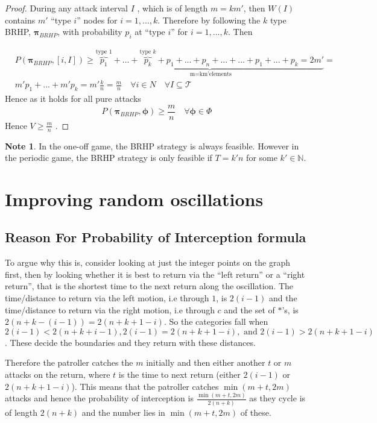 \documentclass[a4paper,10pt]{article}
\theoremstyle{definition}
\theoremstyle{definition}
\theoremstyle{remark}
\theoremstyle{definition}
\newtheorem*{note}{Note}
\begin{document}
\begin{proof}
During any attack interval $I$ , which is of length $m=km'$, then $W(I)$ contains $m'$ ``type $i$'' nodes for $i=1,...,k$. Therefore by following the $k$ type BRHP, $\bm{\pi}_{BRHP}$, with probability $p_{i}$ at ``type $i$'' for $i=1,...,k$. Then

\begin{align*}
&P(\bm{\pi}_{BRHP},[i,I]) \geq \underbrace{\overbrace{p_{1}}^{\text{type } 1}+...+
\overbrace{p_{k}}^{\text{type } k}+p_{1}+...+p_{n}+...+...+p_{1}+...+p_{k}=2m'}_{\text{ m=km'elements}}= \\
&m' p_{1}+...+m'p_{k}=m' \frac{k}{n}=\frac{m}{n} \quad \forall i \in N \quad \forall I \subseteq \mathcal{T}
\end{align*}
Hence as it holds for all pure attacks
$$P(\bm{\pi}_{BRHP},\pmb{\phi}) \geq \frac{m}{n} \quad \forall \bm{\phi} \in \Phi$$
Hence $V \geq \frac{m}{n}$ .
\end{proof}

\begin{note}
In the one-off game, the BRHP strategy is always feasible. However in the periodic game, the BRHP strategy is only feasible if $T=k'n$ for some $k' \in \mathbb{N}$.
\end{note}

\section{Improving random oscillations}
\label{Appendix:Improving random oscillations}

\subsection{Reason For Probability of Interception formula}
\label{Appendix:Reason for probability of interception}
To argue why this is, consider looking at just the integer points on the graph first,
then by looking whether it is best to return via the ``left return'' or a ``right return'', that is the shortest time to the next return along the oscillation. The time/distance to return via the left motion, i.e through $1$, is $2(i-1)$ and the time/distance to return via the right motion, i.e through $c$ and the set of $*$'s, is $2(n+k-(i-1))=2(n+k+1-i)$. So the categories fall when $2(i-1) < 2(n+k+i-1) , 2(i-1)=2(n+k+1-i) , \text{ and } 2(i-1) > 2(n+k+1-i)$. These decide the boundaries and they return with these distances.

Therefore the patroller catches the $m$ initially and then either another $t$ or $m$ attacks on the return, where $t$ is the time to next return (either $2(i-1)$ or $2(n+k+1-i)$). This means that the patroller catches $\min(m+t,2m)$ attacks and hence the probability of interception is $\frac{\min(m+t,2m)}{2(n+k)}$ as they cycle is of length $2(n+k)$ and the number lies in $\min(m+t,2m)$ of these.
\end{document}
